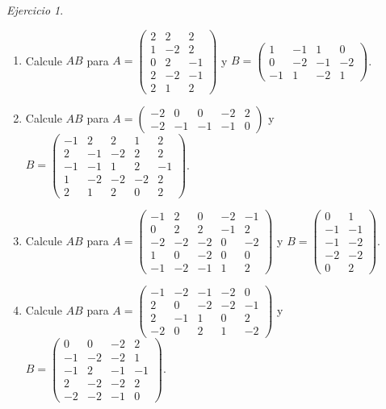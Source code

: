\documentclass[12pt]{article}
\theoremstyle{remark}
\newtheorem{Ejer}[definicion]{Ejercicio}
\begin{document}
\begin{Ejer}
\begin{enumerate}[resume=banco]
\item Calcule $AB$ para $A=\begin{pmatrix}2&2&2\\1&-2&2\\0&2&-1\\2&-2&-1\\2&1&2\end{pmatrix}$ y $B=\begin{pmatrix}1&-1&1&0\\0&-2&-1&-2\\-1&1&-2&1\end{pmatrix}$.

\item Calcule $AB$ para $A=\begin{pmatrix}-2&0&0&-2&2\\-2&-1&-1&-1&0\end{pmatrix}$ y $B=\begin{pmatrix}-1&2&2&1&2\\2&-1&-2&2&2\\-1&-1&1&2&-1\\1&-2&-2&-2&2\\2&1&2&0&2\end{pmatrix}$.

\item Calcule $AB$ para $A=\begin{pmatrix}-1&2&0&-2&-1\\0&2&2&-1&2\\-2&-2&-2&0&-2\\1&0&-2&0&0\\-1&-2&-1&1&2\end{pmatrix}$ y $B=\begin{pmatrix}0&1\\-1&-1\\-1&-2\\-2&-2\\0&2\end{pmatrix}$.

\item Calcule $AB$ para $A=\begin{pmatrix}-1&-2&-1&-2&0\\2&0&-2&-2&-1\\2&-1&1&0&2\\-2&0&2&1&-2\end{pmatrix}$ y $B=\begin{pmatrix}0&0&-2&2\\-1&-2&-2&1\\-1&2&-1&-1\\2&-2&-2&2\\-2&-2&-1&0\end{pmatrix}$.
\end{enumerate}
\end{Ejer}
\end{document}
